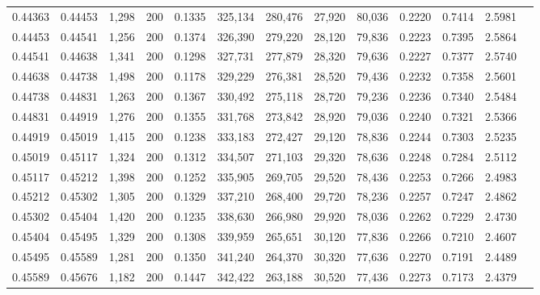 \begin{tabular}{rrrrrrrrrrrrr}
0.44363 & 0.44453 & 1,298 & 200 &                                     0.1335 & 325,134 & 280,476 &  27,920 &  80,036 & 0.2220 & 0.7414 & 2.5981 \\
0.44453 & 0.44541 & 1,256 & 200 &                                     0.1374 & 326,390 & 279,220 &  28,120 &  79,836 & 0.2223 & 0.7395 & 2.5864 \\
0.44541 & 0.44638 & 1,341 & 200 &                                     0.1298 & 327,731 & 277,879 &  28,320 &  79,636 & 0.2227 & 0.7377 & 2.5740 \\
0.44638 & 0.44738 & 1,498 & 200 &                                     0.1178 & 329,229 & 276,381 &  28,520 &  79,436 & 0.2232 & 0.7358 & 2.5601 \\
0.44738 & 0.44831 & 1,263 & 200 &                                     0.1367 & 330,492 & 275,118 &  28,720 &  79,236 & 0.2236 & 0.7340 & 2.5484 \\
0.44831 & 0.44919 & 1,276 & 200 &                                     0.1355 & 331,768 & 273,842 &  28,920 &  79,036 & 0.2240 & 0.7321 & 2.5366 \\
0.44919 & 0.45019 & 1,415 & 200 &                                     0.1238 & 333,183 & 272,427 &  29,120 &  78,836 & 0.2244 & 0.7303 & 2.5235 \\
0.45019 & 0.45117 & 1,324 & 200 &                                     0.1312 & 334,507 & 271,103 &  29,320 &  78,636 & 0.2248 & 0.7284 & 2.5112 \\
0.45117 & 0.45212 & 1,398 & 200 &                                     0.1252 & 335,905 & 269,705 &  29,520 &  78,436 & 0.2253 & 0.7266 & 2.4983 \\
0.45212 & 0.45302 & 1,305 & 200 &                                     0.1329 & 337,210 & 268,400 &  29,720 &  78,236 & 0.2257 & 0.7247 & 2.4862 \\
0.45302 & 0.45404 & 1,420 & 200 &                                     0.1235 & 338,630 & 266,980 &  29,920 &  78,036 & 0.2262 & 0.7229 & 2.4730 \\
0.45404 & 0.45495 & 1,329 & 200 &                                     0.1308 & 339,959 & 265,651 &  30,120 &  77,836 & 0.2266 & 0.7210 & 2.4607 \\
0.45495 & 0.45589 & 1,281 & 200 &                                     0.1350 & 341,240 & 264,370 &  30,320 &  77,636 & 0.2270 & 0.7191 & 2.4489 \\
0.45589 & 0.45676 & 1,182 & 200 &                                     0.1447 & 342,422 & 263,188 &  30,520 &  77,436 & 0.2273 & 0.7173 & 2.4379 \\

\end{tabular}
